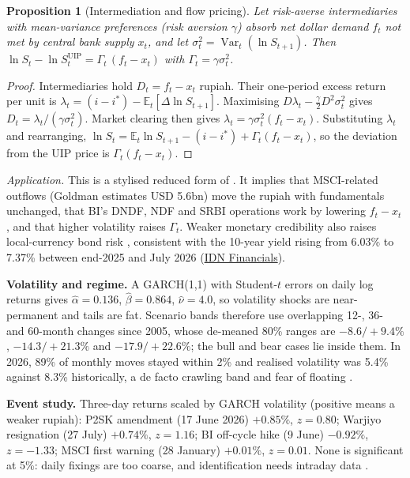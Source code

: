 \documentclass[10pt]{article}
\theoremstyle{plain}\newtheorem{proposition}{Proposition}
\theoremstyle{remark}\newtheorem*{remark}{Remark}
\newcommand{\E}{\mathbb{E}}
\newcommand{\Var}{\operatorname{Var}}
\begin{document}
\begin{proposition}[Intermediation and flow pricing]
Let risk-averse intermediaries with mean-variance preferences (risk aversion $\gamma$) absorb net dollar demand $f_t$ not met by central bank supply $x_t$, and let $\sigma_t^2=\Var_t(\ln S_{t+1})$. Then $\ln S_t-\ln S_t^{\mathrm{UIP}}=\Gamma_t\,(f_t-x_t)$ with $\Gamma_t=\gamma\sigma_t^2$.
\end{proposition}
\begin{proof}
Intermediaries hold $D_t=f_t-x_t$ rupiah. Their one-period excess return per unit is $\lambda_t=(i-i^*)-\E_t[\Delta\ln S_{t+1}]$. Maximising $D\lambda_t-\tfrac{\gamma}{2}D^2\sigma_t^2$ gives $D_t=\lambda_t/(\gamma\sigma_t^2)$. Market clearing then gives $\lambda_t=\gamma\sigma_t^2(f_t-x_t)$. Substituting $\lambda_t$ and rearranging, $\ln S_t=\E_t\ln S_{t+1}-(i-i^*)+\Gamma_t(f_t-x_t)$, so the deviation from the UIP price is $\Gamma_t(f_t-x_t)$. \qedhere
\end{proof}
\textit{Application.} This is a stylised reduced form of \citet{gabaix2015}. It implies that MSCI-related outflows (Goldman estimates USD 5.6bn) move the rupiah with fundamentals unchanged, that BI's DNDF, NDF and SRBI operations work by lowering $f_t-x_t$ \citep{fanelli2021,itskhoki2023}, and that higher volatility raises $\Gamma_t$. Weaker monetary credibility also raises local-currency bond risk \citep{du2020}, consistent with the 10-year yield rising from 6.03\% to 7.37\% between end-2025 and July 2026 (\href{https://www.idnfinancials.com/news/66794/dbs-indonesias-10-year-yield-unlikely-to-fall-below-7}{IDN Financials}).

\textbf{Volatility and regime.} A GARCH(1,1) with Student-$t$ errors on daily log returns gives $\hat\alpha=0.136$, $\hat\beta=0.864$, $\hat\nu=4.0$, so volatility shocks are near-permanent and tails are fat. Scenario bands therefore use overlapping 12-, 36- and 60-month changes since 2005, whose de-meaned 80\% ranges are $-8.6/+9.4\%$, $-14.3/+21.3\%$ and $-17.9/+22.6\%$; the bull and bear cases lie inside them. In 2026, 89\% of monthly moves stayed within 2\% and realised volatility was 5.4\% against 8.3\% historically, a de facto crawling band \citep{reinhart2004} and fear of floating \citep{calvo2002}.

\textbf{Event study.} Three-day returns scaled by GARCH volatility (positive means a weaker rupiah): P2SK amendment (17 June 2026) $+0.85\%$, $z=0.80$; Warjiyo resignation (27 July) $+0.74\%$, $z=1.16$; BI off-cycle hike (9 June) $-0.92\%$, $z=-1.33$; MSCI first warning (28 January) $+0.01\%$, $z=0.01$. None is significant at 5\%: daily fixings are too coarse, and identification needs intraday data \citep{gurkaynak2005,nakamura2018}.
\end{document}
